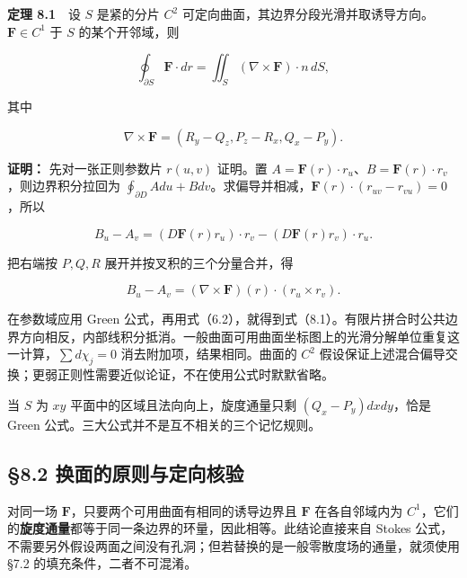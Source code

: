 \documentclass[11pt,a4paper]{article}
\begin{document}
\textbf{定理 8.1}　设 \(S\) 是紧的分片 \(C^2\)
可定向曲面，其边界分段光滑并取诱导方向。\(\mathbf F\in C^1\) 于 \(S\)
的某个开邻域，则

\begin{equation*}
 \oint_{\partial S}\mathbf F\cdot dr
 =\iint_S(\nabla\times\mathbf F)\cdot n\,dS,\tag{8.1}
\end{equation*}

其中

\begin{equation*}
 \nabla\times\mathbf F=(R_y-Q_z,P_z-R_x,Q_x-P_y).
\end{equation*}

\textbf{证明：} 先对一张正则参数片 \(r(u,v)\) 证明。置
\(A=\mathbf F(r)\cdot r_u\)、\(B=\mathbf F(r)\cdot r_v\)，则边界积分拉回为
\(\oint_{\partial D}Adu+Bdv\)。求偏导并相减，\(\mathbf F(r)\cdot(r_{uv}-r_{vu})=0\)，所以

\begin{equation*}
 B_u-A_v=(D\mathbf F(r)r_u)\cdot r_v-(D\mathbf F(r)r_v)\cdot r_u.
\end{equation*}

把右端按 \(P,Q,R\) 展开并按叉积的三个分量合并，得

\begin{equation*}
 B_u-A_v=(\nabla\times\mathbf F)(r)\cdot(r_u\times r_v).
\end{equation*}

在参数域应用 Green
公式，再用式（6.2），就得到式（8.1）。有限片拼合时公共边界方向相反，内部线积分抵消。一般曲面可用曲面坐标图上的光滑分解单位重复这一计算，\(\sum d\chi_j=0\)
消去附加项，结果相同。曲面的 \(C^2\)
假设保证上述混合偏导交换；更弱正则性需要近似论证，不在使用公式时默默省略。

当 \(S\) 为 \(xy\) 平面中的区域且法向向上，旋度通量只剩
\((Q_x-P_y)dxdy\)，恰是 Green
公式。三大公式并不是互不相关的三个记忆规则。

\subsection{§8.2
换面的原则与定向核验}\label{ux6362ux9762ux7684ux539fux5219ux4e0eux5b9aux5411ux6838ux9a8c}

对同一场 \(\mathbf F\)，只要两个可用曲面有相同的诱导边界且 \(\mathbf F\)
在各自邻域内为
\(C^1\)，它们的\textbf{旋度通量}都等于同一条边界的环量，因此相等。此结论直接来自
Stokes
公式，不需要另外假设两面之间没有孔洞；但若替换的是一般零散度场的通量，就须使用
§7.2 的填充条件，二者不可混淆。
\end{document}
